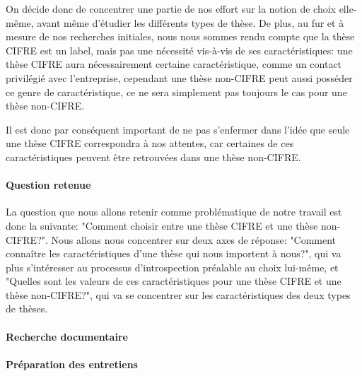 \documentclass[12pt]{article}
\begin{document}
On décide donc de concentrer une partie de nos effort sur la notion de choix elle-même, avant même d'étudier les différents types de thèse. De plus, au fur et à mesure de nos recherches initiales, nous nous sommes rendu compte que la thèse CIFRE est un label, mais pas une nécessité vis-à-vis de ses caractéristiques: une thèse CIFRE aura nécessairement certaine caractéristique, comme un contact privilégié avec l'entreprise, cependant une thèse non-CIFRE peut aussi posséder ce genre de caractéristique, ce ne sera simplement pas toujours le cas pour une thèse non-CIFRE.

Il est donc par conséquent important de ne pas s'enfermer dans l'idée que seule une thèse CIFRE correspondra à nos attentes, car certaines de ces caractéristiques peuvent être retrouvées dans une thèse non-CIFRE.

\paragraph{Question retenue} La question que nous allons retenir comme problématique de notre travail est donc la suivante: "Comment choisir entre une thèse CIFRE et une thèse non-CIFRE?". Nous allons nous concentrer sur deux axes de réponse: "Comment connaître les caractéristiques d’une thèse qui nous importent à nous?", qui va plus s'intéresser au processus d'introspection préalable au choix lui-même, et "Quelles sont les valeurs de ces caractéristiques pour une thèse CIFRE et une thèse non-CIFRE?", qui va se concentrer sur les caractéristiques des deux types de thèses.


\paragraph{Recherche documentaire}

\paragraph{Préparation des entretiens}
\end{document}
